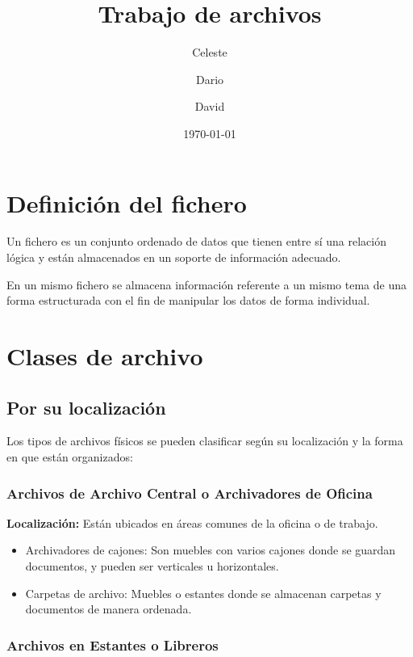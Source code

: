\documentclass{article}
\title{Trabajo de archivos}
\author{
Celeste \and Dario \and David
}
\date{\today}
\begin{document}
\maketitle

\tableofcontents

\section{Definición del fichero}

Un fichero es un conjunto ordenado de datos que tienen entre sí una relación lógica y están almacenados en un soporte de información adecuado.

En un mismo fichero se almacena información referente a un mismo tema de una forma estructurada con el fin de manipular los datos de forma individual.

\hrulefill

\section{Clases de archivo}

\subsection{Por su localización}

Los tipos de archivos físicos se pueden clasificar según su localización y la forma en que están organizados:

\subsubsection{Archivos de Archivo Central o Archivadores de Oficina}

\textbf{Localización:} Están ubicados en áreas comunes de la oficina o de trabajo.

\begin{itemize}
    \item   Archivadores de cajones: Son muebles con varios cajones donde se guardan documentos, y pueden ser verticales u horizontales.
    \item   Carpetas de archivo: Muebles o estantes donde se almacenan carpetas y documentos de manera ordenada.
\end{itemize}

\subsubsection{Archivos en Estantes o Libreros}
\end{document}
